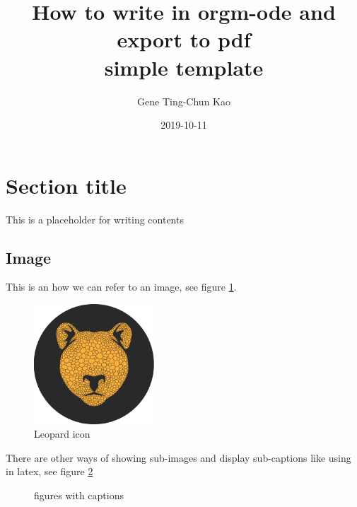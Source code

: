\documentclass[a4paper,11pt]{article}
\author{Gene Ting-Chun Kao}
\date{2019-10-11}
\title{How to write in orgm-ode and export to pdf\\\medskip
\large simple template}
\begin{document}
\maketitle


\section*{Section title}
\label{sec:org9251529}

This is a placeholder for writing contents


\subsection*{Image}
\label{sec:org9a0f0ca}

This is an how we can refer to an image, see figure \ref{fig:orgcb1535d}.

\begin{figure}[htbp]
\centering
\includegraphics[width=0.4\textwidth]{./images/Leopard-ICON-circle.png}
\caption{\label{fig:orgcb1535d}
Leopard icon}
\end{figure}

There are other ways of showing sub-images and display sub-captions like using in latex,
see figure \ref{orgf95eec4}

\begin{figure}
    \centering
\caption{\label{orgf95eec4}
figures with captions}
\end{figure}
\end{document}
